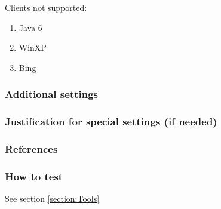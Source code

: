 Clients not supported:
\begin{enumerate}
  \item Java 6
  \item WinXP
  \item Bing
\end{enumerate}


\subsubsection{Additional settings}


\subsubsection{Justification for special settings (if needed)}


\subsubsection{References}


\subsubsection{How to test}
See section \ref{section:Tools}

